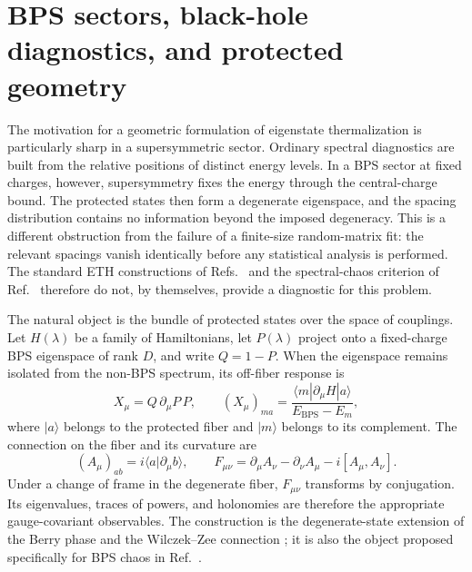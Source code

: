 \section{BPS sectors, black-hole diagnostics, and protected geometry}
\label{sec:bps-black-holes}

The motivation for a geometric formulation of eigenstate thermalization is
particularly sharp in a supersymmetric sector.  Ordinary spectral diagnostics
are built from the relative positions of distinct energy levels.  In a BPS
sector at fixed charges, however, supersymmetry fixes the energy through the
central-charge bound.  The protected states then form a degenerate eigenspace,
and the spacing distribution contains no information beyond the imposed
degeneracy.  This is a different obstruction from the failure of a finite-size
random-matrix fit: the relevant spacings vanish identically before any
statistical analysis is performed.  The standard ETH constructions of
Refs.~\cite{deutsch1991,srednicki1994} and the spectral-chaos criterion of
Ref.~\cite{bohigas1984} therefore do not, by themselves, provide a diagnostic
for this problem.

The natural object is the bundle of protected states over the space of
couplings.  Let $H(\lambda)$ be a family of Hamiltonians, let
$P(\lambda)$ project onto a fixed-charge BPS eigenspace of rank $D$, and write
$Q=1-P$.  When the eigenspace remains isolated from the non-BPS spectrum, its
off-fiber response is
\begin{equation}
 X_\mu=Q\,\partial_\mu P\,P,
 \qquad
 (X_\mu)_{ma}=\frac{\langle m|\partial_\mu H|a\rangle}{E_{\mathrm{BPS}}-E_m},
 \label{eq:bps-projector-response}
\end{equation}
where $|a\rangle$ belongs to the protected fiber and $|m\rangle$ belongs to
its complement.  The connection on the fiber and its curvature are
\begin{equation}
 (A_\mu)_{ab}=i\langle a|\partial_\mu b\rangle,
 \qquad
 F_{\mu\nu}=\partial_\mu A_\nu-\partial_\nu A_\mu-i[A_\mu,A_\nu].
 \label{eq:bps-berry-curvature}
\end{equation}
Under a change of frame in the degenerate fiber, $F_{\mu\nu}$ transforms by
conjugation.  Its eigenvalues, traces of powers, and holonomies are therefore
the appropriate gauge-covariant observables.  The construction is the
degenerate-state extension of the Berry phase and the Wilczek--Zee connection
\cite{berry1984,wilczekzee1984}; it is also the object proposed specifically
for BPS chaos in Ref.~\cite{chen2024bps}.

